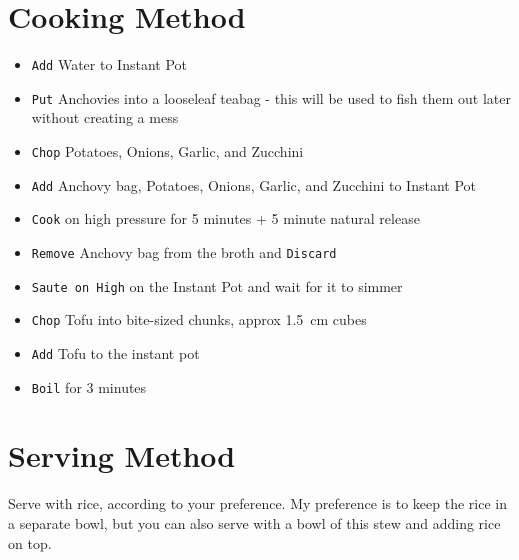 \documentclass{article}
\begin{document}
\begin{multicols}{2}
\section{Cooking Method}
\begin{itemize}
	\item \verb|Add| Water to Instant Pot
	\item \verb|Put| Anchovies into a looseleaf teabag - this will be used to fish them out later without creating a mess
	\item \verb|Chop| Potatoes, Onions, Garlic, and Zucchini
	\item \verb|Add| Anchovy bag, Potatoes, Onions, Garlic, and Zucchini to Instant Pot
	\item \verb|Cook| on high pressure for 5 minutes + 5 minute natural release
	\item \verb|Remove| Anchovy bag from the broth and \verb|Discard|
	\item \verb|Saute on High| on the Instant Pot and wait for it to simmer
	\item \verb|Chop| Tofu into bite-sized chunks, approx \SI{1.5}{cm} cubes
	\item \verb|Add| Tofu to the instant pot
	\item \verb|Boil| for 3 minutes
\end{itemize}

\section{Serving Method}
Serve with rice, according to your preference. My preference is to keep the rice in a separate bowl, but you can also serve with a bowl of this stew and adding rice on top.



\end{multicols}
\end{document}
